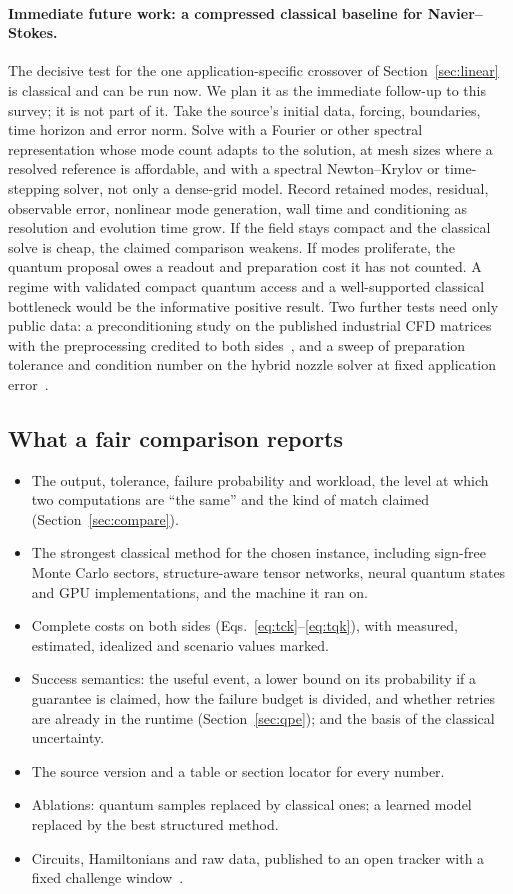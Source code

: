 \documentclass[10pt,a4paper]{article}
\begin{document}
\paragraph{Immediate future work: a compressed classical baseline for Navier--Stokes.} The decisive test for the one application-specific crossover of Section~\ref{sec:linear} is classical and can be run now. We plan it as the immediate follow-up to this survey; it is not part of it. Take the source's initial data, forcing, boundaries, time horizon and error norm. Solve with a Fourier or other spectral representation whose mode count adapts to the solution, at mesh sizes where a resolved reference is affordable, and with a spectral Newton--Krylov or time-stepping solver, not only a dense-grid model. Record retained modes, residual, observable error, nonlinear mode generation, wall time and conditioning as resolution and evolution time grow. If the field stays compact and the classical solve is cheap, the claimed comparison weakens. If modes proliferate, the quantum proposal owes a readout and preparation cost it has not counted. A regime with validated compact quantum access and a well-supported classical bottleneck would be the informative positive result. Two further tests need only public data: a preconditioning study on the published industrial CFD matrices with the preprocessing credited to both sides~\cite{lapworth2025}, and a sweep of preparation tolerance and condition number on the hybrid nozzle solver at fixed application error~\cite{goldfriend2026}.

\subsection{What a fair comparison reports}
\begin{itemize}
\item The output, tolerance, failure probability and workload, the level at which two computations are ``the same'' and the kind of match claimed (Section~\ref{sec:compare}).
\item The strongest classical method for the chosen instance, including sign-free Monte Carlo sectors, structure-aware tensor networks, neural quantum states and GPU implementations, and the machine it ran on.
\item Complete costs on both sides (Eqs.~\ref{eq:tck}--\ref{eq:tqk}), with measured, estimated, idealized and scenario values marked.
\item Success semantics: the useful event, a lower bound on its probability if a guarantee is claimed, how the failure budget is divided, and whether retries are already in the runtime (Section~\ref{sec:qpe}); and the basis of the classical uncertainty.
\item The source version and a table or section locator for every number.
\item Ablations: quantum samples replaced by classical ones; a learned model replaced by the best structured method.
\item Circuits, Hamiltonians and raw data, published to an open tracker with a fixed challenge window~\cite{pq_ibm3}.
\end{itemize}
\end{document}
